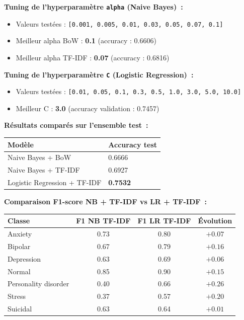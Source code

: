 \documentclass[12pt,a4paper]{report}
\begin{document}
\textbf{Tuning de l'hyperparamètre \texttt{alpha} (Naive Bayes)~:}
\begin{itemize}
  \item Valeurs testées : \texttt{[0.001, 0.005, 0.01, 0.03, 0.05, 0.07, 0.1]}
  \item Meilleur alpha BoW : \textbf{0.1} (accuracy : 0.6606)
  \item Meilleur alpha TF-IDF : \textbf{0.07} (accuracy : 0.6816)
\end{itemize}

\textbf{Tuning de l'hyperparamètre \texttt{C} (Logistic Regression)~:}
\begin{itemize}
  \item Valeurs testées : \texttt{[0.01, 0.05, 0.1, 0.3, 0.5, 1.0, 3.0, 5.0, 10.0]}
  \item Meilleur C : \textbf{3.0} (accuracy validation : 0.7457)
\end{itemize}

\textbf{Résultats comparés sur l'ensemble test~:}

\begin{center}
\begin{tabular}{ll}
\toprule
\textbf{Modèle} & \textbf{Accuracy test} \\
\midrule
Naive Bayes + BoW            & 0.6666 \\
Naive Bayes + TF-IDF         & 0.6927 \\
Logistic Regression + TF-IDF & \textbf{0.7532} \\
\bottomrule
\end{tabular}
\end{center}

\textbf{Comparaison F1-score NB + TF-IDF vs LR + TF-IDF~:}

\begin{center}
\begin{tabular}{lccc}
\toprule
\textbf{Classe} & \textbf{F1 NB TF-IDF} & \textbf{F1 LR TF-IDF} & \textbf{Évolution} \\
\midrule
Anxiety              & 0.73 & 0.80 & $+0.07$ \\
Bipolar              & 0.67 & 0.79 & $+0.16$ \\
Depression           & 0.63 & 0.69 & $+0.06$ \\
Normal               & 0.85 & 0.90 & $+0.15$ \\
Personality disorder & 0.40 & 0.66 & $\mathbf{+0.26}$ \\
Stress               & 0.37 & 0.57 & $\mathbf{+0.20}$ \\
Suicidal             & 0.63 & 0.64 & $+0.01$ \\
\bottomrule
\end{tabular}
\end{center}
\end{document}
